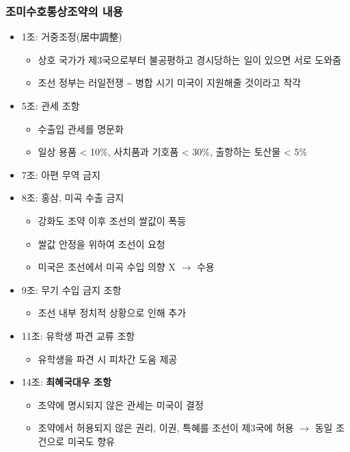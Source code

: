 \subsubsection*{조미수호통상조약의 내용}
\begin{itemize}
    \item 1조: 거중조정(居中調整)
    \begin{itemize}
        \item 상호 국가가 제3국으로부터 불공평하고 경시당하는 일이 있으면 서로 도와줌
        \item 조선 정부는 러일전쟁 \textasciitilde{} 병합 시기 미국이 지원해줄 것이라고 착각
    \end{itemize}
    \item 5조: 관세 조항
    \begin{itemize}
        \item 수출입 관세를 명문화
        \item 일상 용품 \textless{} 10\%, 사치품과 기호품 \textless{} 30\%, 출항하는 토산물 \textless{} 5\%
    \end{itemize}
    \item 7조: 아편 무역 금지
    \item 8조: 홍삼, 미곡 수출 금지
    \begin{itemize}
        \item 강화도 조약 이후 조선의 쌀값이 폭등
        \item 쌀값 안정을 위하여 조선이 요청
        \item 미국은 조선에서 미곡 수입 의향 X $\rightarrow$ 수용
    \end{itemize}
    \item 9조: 무기 수입 금지 조항
    \begin{itemize}
        \item 조선 내부 정치적 상황으로 인해 추가
    \end{itemize}
    \item 11조: 유학생 파견 교류 조항
    \begin{itemize}
        \item 유학생을 파견 시 피차간 도움 제공
    \end{itemize}
    \item 14조: \textbf{최혜국대우 조항}
    \begin{itemize}
        \item 조약에 명시되지 않은 관세는 미국이 결정
        \item 조약에서 허용되지 않은 권리, 이권, 특혜를 조선이 제3국에 허용 $\rightarrow$ 동일 조건으로 미국도 향유
    \end{itemize}
\end{itemize}

